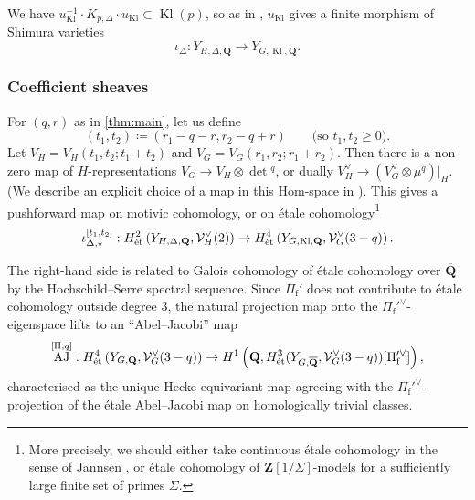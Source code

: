 \documentclass[cjm]{ipart}
\theoremstyle{plain}
\theoremstyle{remark}
\DeclareMathOperator{\AJ}{AJ}
\DeclareMathOperator{\Kl}{Kl}
\newcommand{\Af}{\AA_{\mathrm{f}}}
\newcommand{\Pif}{\Pi_{\mathrm{f}}}
\newcommand{\QQbar}{\overline{\QQ}}
\newcommand{\QQ}{\mathbf{Q}}
\newcommand{\ZZ}{\mathbf{Z}}
\newcommand{\cH}{\mathcal{H}}
\newcommand{\cS}{\mathcal{S}}
\newcommand{\cV}{\mathcal{V}}
\newcommand{\et}{\text{\textup{\'et}}}
\renewcommand{\AA}{\mathbf{A}}
\numberwithin{equation}{subsection}
\renewcommand{\ge}{\geqslant}
\begin{document}
  We have $u_{\Kl}^{-1} \cdot K_{p, \Delta}\cdot u_{\Kl} \subset \Kl(p)$, so as in \cite[\S 4.1]{LPSZ1}, $u_{\Kl}$ gives a finite morphism of Shimura varieties
  \begin{equation}
   \label{eq:iotaDelta}
   \iota_{\Delta}: Y_{H, \Delta,\QQ} \to Y_{G, \Kl,\QQ}.
  \end{equation}

  \subsubsection*{Coefficient sheaves} For $(q, r)$ as in \cref{thm:main}, let us define
  \begin{equation}
   \label{eq:qrtetc}
   (t_1, t_2) \coloneqq (r_1 - q - r, r_2 - q + r) \qquad \text{(so $t_1, t_2 \ge 0$).}
  \end{equation}
  Let $V_H = V_H(t_1, t_2; t_1 + t_2)$ and $V_G = V_G(r_1, r_2; r_1 + r_2)$. Then there is a non-zero map of $H$-representations $V_G \to V_H \otimes \det{}^q$, or dually $V_H^\vee \to (V_G^\vee \otimes \mu^q)|_{H}$. (We describe an explicit choice of a map in this Hom-space in \cite[eq. (5)]{LSZ17}). This gives a pushforward map on motivic cohomology, or on \'etale cohomology\footnote{More precisely, we should either take continuous \'etale cohomology in the sense of Jannsen \cite{jannsen88}, or \'etale cohomology of $\ZZ[1/\Sigma]$-models for a sufficiently large finite set of primes $\Sigma$.}
  \[
   \iota_{\Delta, \star}^{[t_1, t_2]}:
   H^2_{\et}\left(Y_{H, \Delta, \QQ}, \cV_H^\vee(2)\right) \to H^4_{\et}\left(Y_{G, \Kl, \QQ}, \cV_G^\vee(3-q)\right).
  \]

  The right-hand side is related to Galois cohomology of \'etale cohomology over $\QQbar$ by the Hochs\-child--Serre spectral sequence. Since $\Pif'$ does not contribute to \'etale cohomology outside degree 3, the natural projection map onto the $\Pif'^\vee$-eigenspace lifts to an ``Abel--Jacobi'' map
  \begin{equation}
   \label{eq:def_prPi}
   \AJ^{[\Pi, q]} : H^4_{\et}\left(Y_{G,\QQ}, \cV_G^\vee(3-q)\right) \to H^1\left(\QQ, H^3_{\et}(Y_{G,\QQbar}, \cV_G^\vee(3-q))[\Pif'^\vee]\right),
  \end{equation}
  characterised as the unique Hecke-equivariant map agreeing with the $\Pif'^\vee$-projection of the \'etale Abel--Jacobi map on homologically trivial classes.

\end{document}
